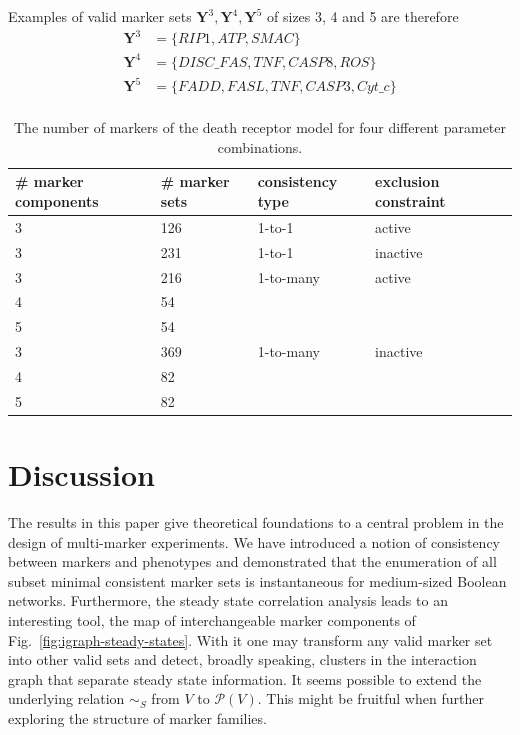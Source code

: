 \documentclass[11pt]{article}
\begin{document}
    Examples of valid marker sets $\mathbf Y^3, \mathbf Y^4, \mathbf Y^5$ of sizes 3, 4 and 5 are therefore
    \begin{align*}
        \mathbf Y^3 &= \{RIP1, ATP, SMAC\}\\
        \mathbf Y^4 &= \{DISC\_FAS, TNF, CASP8,ROS\}\\
        \mathbf Y^5 &= \{FADD, FASL, TNF, CASP3,Cyt\_c\}\\
    \end{align*}

    \begin{table}
        \caption{The number of markers of the death receptor model for four different parameter combinations.}
        \label{tab:calzone_markers}
        \begin{minipage}{\columnwidth}
            \begin{center}
                \begin{tabular}{lllll}
                    \# marker components & \# marker sets & consistency type & exclusion constraint\\
                    \toprule
                    3& 126& 1-to-1 & active\\
                    \midrule
                    3& 231& 1-to-1 & inactive\\
                    \midrule
                    3& 216& 1-to-many & active\\
                    4& 54&  & \\
                    5& 54&  & \\
                    \midrule
                    3& 369& 1-to-many & inactive\\
                    4& 82&  & \\
                    5& 82&  & \\
                    \bottomrule
                \end{tabular}
            \end{center}
        \bigskip
        \end{minipage}
    \end{table}

    \section{Discussion}\label{sec:discussion}
    The results in this paper give theoretical foundations to a central problem in the design of multi-marker experiments.
    We have introduced a notion of consistency between markers and phenotypes and demonstrated that the enumeration of all subset minimal consistent marker sets is instantaneous for medium-sized Boolean networks.
    Furthermore, the steady state correlation analysis leads to an interesting tool, the map of interchangeable marker components of Fig.~\ref{fig:igraph-steady-states}.
    With it one may transform any valid marker set into other valid sets and detect, broadly speaking, clusters in the interaction graph that separate steady state information.
    It seems possible to extend the underlying relation $\sim_S$ from $V$ to $\mathcal P(V)$.
    This might be fruitful when further exploring the structure of marker families.
\end{document}

